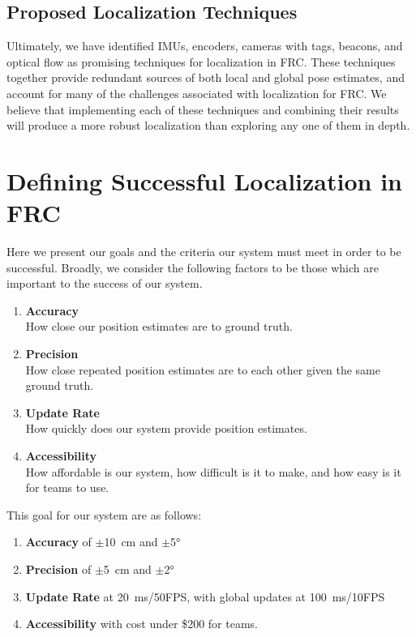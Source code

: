 \documentclass{article}
\begin{document}
  \subsection{Proposed Localization Techniques} \label{section:proposed_techniques}

    Ultimately, we have identified IMUs, encoders, cameras with tags, beacons, and optical flow as promising techniques for localization in FRC. These techniques together provide redundant sources of both local and global pose estimates, and account for many of the challenges associated with localization for FRC. We believe that implementing each of these techniques and combining their results will produce a more robust localization than exploring any one of them in depth.




\section{Defining Successful Localization in FRC} \label{section:defining_success}

  Here we present our goals and the criteria our system must meet in order to be successful. Broadly, we consider the following factors to be those which are important to the success of our system.
  \begin{enumerate}
    \item \textbf{Accuracy}\\ How close our position estimates are to ground truth.
    \item \textbf{Precision}\\ How close repeated position estimates are to each other given the same ground truth.
    \item \textbf{Update Rate}\\ How quickly does our system provide position estimates.
    \item \textbf{Accessibility}\\ How affordable is our system, how difficult is it to make, and how easy is it for teams to use.
  \end{enumerate}

  This goal for our system are as follows:

  \begin{enumerate}
    \item \textbf{Accuracy} of $\pm$\SI{10}{\centi\meter} and $\pm$\ang{5}
    \item \textbf{Precision} of $\pm$\SI{5}{\centi\meter} and $\pm$\ang{2}
    \item \textbf{Update Rate} at \SI{20}{\milli\second}/50FPS, with global updates at \SI{100}{\milli\second}/10FPS
    \item \textbf{Accessibility} with cost under \$200 for teams.
  \end{enumerate}
\end{document}
